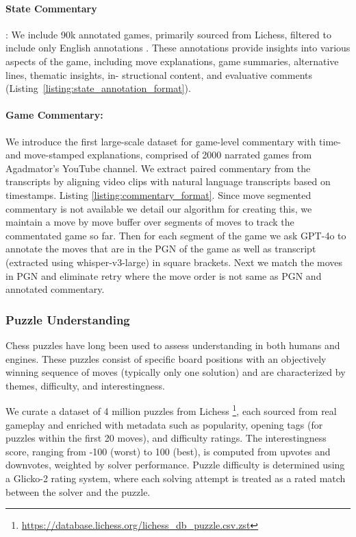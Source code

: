 \paragraph{State Commentary}: We include 90k annotated games, primarily sourced from Lichess, filtered to include only English annotations \cite{jhamtani-etal-2018-learning}. These annotations provide insights into
various aspects of the game, including move explanations,
game summaries, alternative lines, thematic insights, in-
structional content, and evaluative comments (Listing~\ref{listing:state_annotation_format}).

\paragraph{Game Commentary:} We introduce the first large-scale dataset for game-level commentary with time- and move-stamped explanations, comprised of 2000 narrated games from Agadmator’s YouTube channel. We extract paired commentary from the transcripts by aligning video clips with natural language transcripts based on timestamps. Listing \ref{listing:commentary_format}. Since move segmented commentary is not available we detail our algorithm for creating this, we maintain a move by move buffer over segments of moves to track the commentated game so far. Then for each segment of the game we ask GPT-4o to annotate the moves that are in the PGN of the game as well as transcript (extracted using whisper-v3-large) in square brackets. Next we match the moves in PGN and eliminate retry where the move order is not same as PGN and annotated commentary. 

\subsubsection{Puzzle Understanding}
Chess puzzles have long been used to assess understanding in both humans and engines. These puzzles consist of specific board positions with an objectively winning sequence of moves (typically only one solution) and are characterized by themes, difficulty, and interestingness.

We curate a dataset of 4 million puzzles from Lichess \footnote{\url{https://database.lichess.org/lichess_db_puzzle.csv.zst}}, each sourced from real gameplay and enriched with metadata such as popularity, opening tags (for puzzles within the first 20 moves), and difficulty ratings. The interestingness score, ranging from -100 (worst) to 100 (best), is computed from upvotes and downvotes, weighted by solver performance. Puzzle difficulty is determined using a Glicko-2 rating system, where each solving attempt is treated as a rated match between the solver and the puzzle. 

